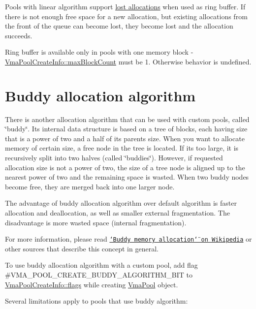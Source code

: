 Pools with linear algorithm support \hyperlink{lost_allocations}{lost allocations} when used as ring buffer. If there is not enough free space for a new allocation, but existing allocations from the front of the queue can become lost, they become lost and the allocation succeeds.



Ring buffer is available only in pools with one memory block -\/ \hyperlink{structVmaPoolCreateInfo_ae41142f2834fcdc82baa4883c187b75c}{Vma\+Pool\+Create\+Info\+::max\+Block\+Count} must be 1. Otherwise behavior is undefined.\hypertarget{custom_memory_pools_buddy_algorithm}{}\section{Buddy allocation algorithm}\label{custom_memory_pools_buddy_algorithm}
There is another allocation algorithm that can be used with custom pools, called \char`\"{}buddy\char`\"{}. Its internal data structure is based on a tree of blocks, each having size that is a power of two and a half of its parent\textquotesingle{}s size. When you want to allocate memory of certain size, a free node in the tree is located. If it\textquotesingle{}s too large, it is recursively split into two halves (called \char`\"{}buddies\char`\"{}). However, if requested allocation size is not a power of two, the size of a tree node is aligned up to the nearest power of two and the remaining space is wasted. When two buddy nodes become free, they are merged back into one larger node.



The advantage of buddy allocation algorithm over default algorithm is faster allocation and deallocation, as well as smaller external fragmentation. The disadvantage is more wasted space (internal fragmentation).

For more information, please read \href{https://en.wikipedia.org/wiki/Buddy_memory_allocation}{\tt \char`\"{}\+Buddy memory allocation\char`\"{} on Wikipedia} or other sources that describe this concept in general.

To use buddy allocation algorithm with a custom pool, add flag \#\+V\+M\+A\+\_\+\+P\+O\+O\+L\+\_\+\+C\+R\+E\+A\+T\+E\+\_\+\+B\+U\+D\+D\+Y\+\_\+\+A\+L\+G\+O\+R\+I\+T\+H\+M\+\_\+\+B\+IT to \hyperlink{structVmaPoolCreateInfo_a8405139f63d078340ae74513a59f5446}{Vma\+Pool\+Create\+Info\+::flags} while creating \hyperlink{structVmaPool}{Vma\+Pool} object.

Several limitations apply to pools that use buddy algorithm\+:


